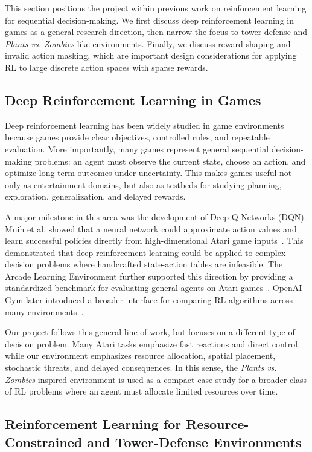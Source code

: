 \documentclass[conference,onecolumn]{IEEEtran}
\begin{document}
This section positions the project within previous work on reinforcement learning for sequential decision-making. We first discuss deep reinforcement learning in games as a general research direction, then narrow the focus to tower-defense and \textit{Plants vs. Zombies}-like environments. Finally, we discuss reward shaping and invalid action masking, which are important design considerations for applying RL to large discrete action spaces with sparse rewards.

\subsection{Deep Reinforcement Learning in Games}

Deep reinforcement learning has been widely studied in game environments because games provide clear objectives, controlled rules, and repeatable evaluation. More importantly, many games represent general sequential decision-making problems: an agent must observe the current state, choose an action, and optimize long-term outcomes under uncertainty. This makes games useful not only as entertainment domains, but also as testbeds for studying planning, exploration, generalization, and delayed rewards.

A major milestone in this area was the development of Deep Q-Networks (DQN). Mnih et al. showed that a neural network could approximate action values and learn successful policies directly from high-dimensional Atari game inputs~\cite{mnih2015humanlevel}. This demonstrated that deep reinforcement learning could be applied to complex decision problems where handcrafted state-action tables are infeasible. The Arcade Learning Environment further supported this direction by providing a standardized benchmark for evaluating general agents on Atari games~\cite{bellemare2013arcade}. OpenAI Gym later introduced a broader interface for comparing RL algorithms across many environments~\cite{gym_docs}.

Our project follows this general line of work, but focuses on a different type of decision problem. Many Atari tasks emphasize fast reactions and direct control, while our environment emphasizes resource allocation, spatial placement, stochastic threats, and delayed consequences. In this sense, the \textit{Plants vs. Zombies}-inspired environment is used as a compact case study for a broader class of RL problems where an agent must allocate limited resources over time.

\subsection{Reinforcement Learning for Resource-Constrained and Tower-Defense Environments}
\end{document}
